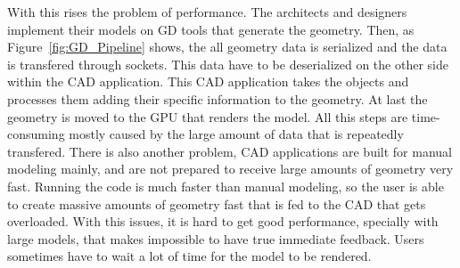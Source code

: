
With this rises the problem of performance. The architects and designers implement their models on GD tools that generate the geometry. Then, as Figure~\ref{fig:GD_Pipeline} shows, the all geometry data is serialized and the data is transfered through sockets. This data have to be deserialized on the other side within the CAD application. This CAD application takes the objects and processes them adding their specific information to the geometry. At last the geometry is moved to the GPU that renders the model. All this steps are time-consuming mostly caused by the large amount of data that is repeatedly transfered. There is also another problem, CAD applications are built for manual modeling mainly, and are not prepared to receive large amounts of geometry very fast. Running the code is much faster than manual modeling, so the user is able to create massive amounts of geometry fast that is fed to the CAD that gets overloaded. With this issues, it is hard to get good performance, specially with large models, that makes impossible to have true immediate feedback. Users sometimes have to wait a lot of time for the model to be rendered.




